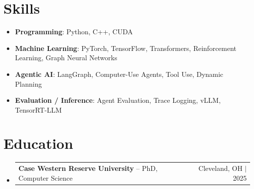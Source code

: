 \documentclass[letterpaper,13pt]{article}
\makeatletter
\newcommand{\resumeProjectHeading}[2]{
    \item
    \begin{tabular*}{\textwidth}{l@{\extracolsep{\fill}}r}
      \small#1 & #2 \\
    \end{tabular*}\vspace{-4pt}
}
\newcommand{\resumeSubHeadingListStart}{\begin{itemize}[leftmargin=0in, label={}]}
\newcommand{\resumeSubHeadingListEnd}{\end{itemize}}
\makeatother
\begin{document}
\section{Skills}
\vspace{0.02cm}
\begin{itemize}[leftmargin=0.15in, label={}, itemsep=2pt, topsep=1pt]
  \item \textbf{Programming}: Python, C++, CUDA
  \item \textbf{Machine Learning}: PyTorch, TensorFlow, Transformers, Reinforcement Learning, Graph Neural Networks
  \item \textbf{Agentic AI}: LangGraph, Computer-Use Agents, Tool Use, Dynamic Planning
  \item \textbf{Evaluation / Inference}: Agent Evaluation, Trace Logging, vLLM, TensorRT-LLM
\end{itemize}
\vspace{0.02cm}

\section{Education}
\resumeSubHeadingListStart
  \resumeProjectHeading{\textbf{Case Western Reserve University} -- PhD, Computer Science}{Cleveland, OH $|$ 2025}
\resumeSubHeadingListEnd
\end{document}
